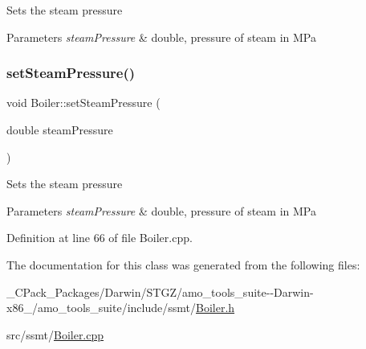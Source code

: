 Sets the steam pressure 
\begin{DoxyParams}{Parameters}
{\em steam\+Pressure} & double, pressure of steam in M\+Pa \\
\hline
\end{DoxyParams}
\mbox{\label{class_boiler_a0a4619ff73c9969daebe3aa66ddad6be}} 
\subsubsection{\texorpdfstring{set\+Steam\+Pressure()}{setSteamPressure()}\hspace{0.1cm}{\footnotesize\ttfamily [3/3]}}
{\footnotesize\ttfamily void Boiler\+::set\+Steam\+Pressure (\begin{DoxyParamCaption}\item[{double}]{steam\+Pressure }\end{DoxyParamCaption})}

Sets the steam pressure 
\begin{DoxyParams}{Parameters}
{\em steam\+Pressure} & double, pressure of steam in M\+Pa \\
\hline
\end{DoxyParams}


Definition at line 66 of file Boiler.\+cpp.



The documentation for this class was generated from the following files\+:\begin{DoxyCompactItemize}
\item 
\+\_\+\+C\+Pack\+\_\+\+Packages/\+Darwin/\+S\+T\+G\+Z/amo\+\_\+tools\+\_\+suite-\/-\/\+Darwin-\/x86\+\_/amo\+\_\+tools\+\_\+suite/include/ssmt/\hyperlink{___c_pack___packages_2_darwin_2_s_t_g_z_2amo__tools__suite--_darwin-x86__64_2amo__tools__suite_2include_2ssmt_2_boiler_8h}{Boiler.\+h}\item 
src/ssmt/\hyperlink{_boiler_8cpp}{Boiler.\+cpp}\end{DoxyCompactItemize}
